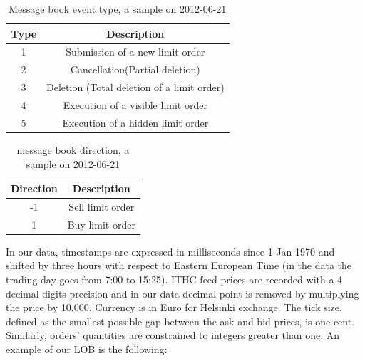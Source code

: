  \begin{table}
 	\caption{Message book event type, a sample on 2012-06-21}
 	\label{tab:type}
 	\begin{center} 
 		\begin{tabular}{|c|c|}
 			\hline
 			Type & Description\\
 			\hline
 			1 & Submission of a new limit order\\
 			2 & Cancellation(Partial deletion)\\
 			3& Deletion (Total deletion of a limit order)\\
 			4 & Execution of a visible limit order \\
 			5 & Execution of a hidden limit order\\
 			\hline 
 		\end{tabular}
 	\end{center}
 \end{table}
  
   \begin{table}
   	\caption{message book direction, a sample on 2012-06-21}
   	\label{tab:direction}
   	\begin{center} 
   		\begin{tabular}{|c|c|}
   			\hline
   			Direction& Description\\
   			\hline
   			-1 & Sell limit order\\
   			1 & Buy limit order\\
   		
   			\hline 
   		\end{tabular}
   	\end{center}
   \end{table}
   
In our data, timestamps are expressed in milliseconds since 1-Jan-1970
and shifted by three hours with respect to Eastern European Time (in the
data the trading day goes from 7:00 to 15:25). ITHC feed prices are recorded
with a 4 decimal digits precision and in our data decimal point is removed by
multiplying the price by 10.000. Currency is in Euro for Helsinki exchange.
The tick size, defined as the smallest possible gap between the ask and bid
prices, is one cent. Similarly, orders’ quantities are constrained to integers
greater than one. An example of our LOB is the following:

